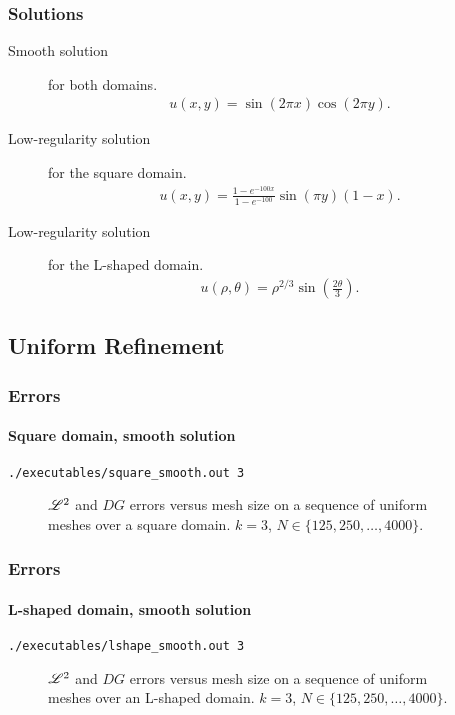 \begin{frame}
    \frametitle{Solutions}

    \begin{description}
        \item[Smooth solution] for both domains.
            \begin{gather}
                u(x, y) = \sin(2 \pi x) \cos(2 \pi y).
            \end{gather}
        \item[Low-regularity solution] for the square domain. 
            \begin{gather}
                u(x, y) = \frac{1 - e^{-100x}}{1 - e^{-100}} \sin(\pi y) (1 - x).
            \end{gather}
        \item[Low-regularity solution] for the L-shaped domain.
            \begin{gather}
                u(\rho, \theta) = \rho^{2 / 3} \sin\left(\frac{2 \theta}{3}\right).
            \end{gather}
    \end{description}
\end{frame}

\subsection{Uniform Refinement}

\begin{frame}[fragile]
    \frametitle{Errors}
    \framesubtitle{Square domain, smooth solution}

    \lstinline{./executables/square_smooth.out 3}

    \begin{figure}[!ht]
        
        \caption{$\mathscr{L}^2$ and $DG$ errors versus mesh size on a sequence of uniform meshes over a square domain. $k = 3$, $N \in \{125, 250, \dots, 4000\}$.}
    \end{figure}
\end{frame}

\begin{frame}[fragile]
    \frametitle{Errors}
    \framesubtitle{L-shaped domain, smooth solution}

    \lstinline{./executables/lshape_smooth.out 3}

    \begin{figure}[!ht]
        
        \caption{$\mathscr{L}^2$ and $DG$ errors versus mesh size on a sequence of uniform meshes over an L-shaped domain. $k = 3$, $N \in \{125, 250, \dots, 4000\}$.}
    \end{figure}
\end{frame}

